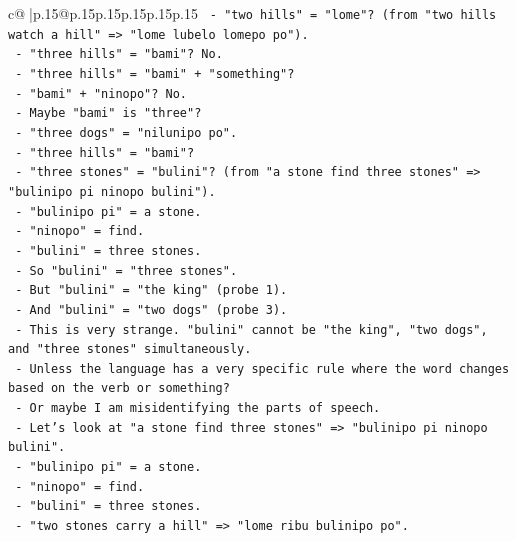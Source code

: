 \documentclass{article}
\begin{document}
{\begin{supertabular}{c@{$\;$}|p{.15\linewidth}@{}p{.15\linewidth}p{.15\linewidth}p{.15\linewidth}p{.15\linewidth}p{.15\linewidth}}
{{{\texttt{                   {-} "two hills" = "lome"? (from "two hills watch a hill" => "lome lubelo lomepo po").} \\
\texttt{                   {-} "three hills" = "bami"? No.} \\
\texttt{                   {-} "three hills" = "bami" + "something"?} \\
\texttt{                   {-} "bami" + "ninopo"? No.} \\
\texttt{                   {-} Maybe "bami" is "three"?} \\
\texttt{                   {-} "three dogs" = "nilunipo po".} \\
\texttt{                   {-} "three hills" = "bami"?} \\
\texttt{                   {-} "three stones" = "bulini"? (from "a stone find three stones" => "bulinipo pi ninopo bulini").} \\
\texttt{                     {-} "bulinipo pi" = a stone.} \\
\texttt{                     {-} "ninopo" = find.} \\
\texttt{                     {-} "bulini" = three stones.} \\
\texttt{                   {-} So "bulini" = "three stones".} \\
\texttt{                   {-} But "bulini" = "the king" (probe 1).} \\
\texttt{                   {-} And "bulini" = "two dogs" (probe 3).} \\
\texttt{                   {-} This is very strange. "bulini" cannot be "the king", "two dogs", and "three stones" simultaneously.} \\
\texttt{                   {-} Unless the language has a very specific rule where the word changes based on the verb or something?} \\
\texttt{                   {-} Or maybe I am misidentifying the parts of speech.} \\
\texttt{                   {-} Let's look at "a stone find three stones" => "bulinipo pi ninopo bulini".} \\
\texttt{                     {-} "bulinipo pi" = a stone.} \\
\texttt{                     {-} "ninopo" = find.} \\
\texttt{                     {-} "bulini" = three stones.} \\
\texttt{                   {-} "two stones carry a hill" => "lome ribu bulinipo po".} \\
}}}
\end{supertabular}}
\end{document}
